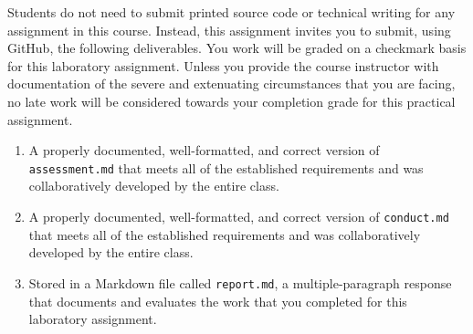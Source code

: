 \documentclass[11pt]{article}
\newcommand{\assessment}{\lstinline{assessment.md}}
\newcommand{\conduct}{\lstinline{conduct.md}}
\newcommand{\reflection}{\lstinline{report.md}}
\begin{document}
\noindent Students do not need to submit printed source code or technical
writing for any assignment in this course. Instead, this assignment invites you
to submit, using GitHub, the following deliverables. You work will be graded on
a checkmark basis for this laboratory assignment.
%
Unless you provide the course instructor with documentation of the severe and
extenuating circumstances that you are facing, no late work will be considered
towards your completion grade for this practical assignment.

\begin{enumerate}

\setlength{\itemsep}{0in}

\item A properly documented, well-formatted, and correct version of
  \assessment{} that meets all of the established requirements and was
  collaboratively developed by the entire class.

\item A properly documented, well-formatted, and correct version of
  \conduct{} that meets all of the established requirements and was
  collaboratively developed by the entire class.

\item Stored in a Markdown file called \reflection{}, a multiple-paragraph
  response that documents and evaluates the work that you completed for this
  laboratory assignment.

\end{enumerate}
\end{document}
